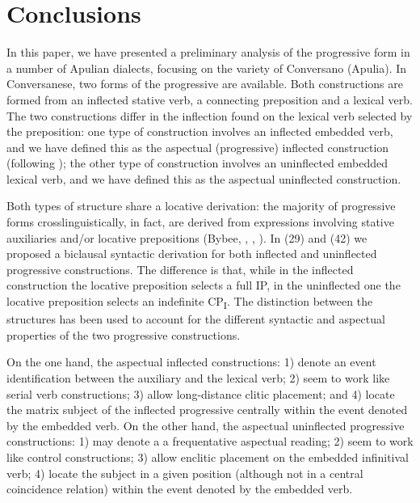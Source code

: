 \documentclass[output=paper]{langsci/langscibook}
\begin{document}
\section{Conclusions}%
In this paper, we have presented a preliminary analysis of the progressive form in a number of Apulian dialects, focusing on the variety of Conversano (Apulia). In Conversanese, two forms of the progressive are available. Both constructions are formed from an inflected stative verb, a connecting preposition and a lexical verb. The two constructions differ in the inflection found on the lexical verb selected by the preposition: one type of construction involves an inflected embedded verb, and we have defined this as the aspectual (progressive) inflected construction (following \citealt{Manzini2005}); the other type of construction involves an uninflected embedded lexical verb, and we have defined this as the aspectual uninflected construction. 

Both types of structure share a locative derivation: the majority of progressive forms crosslinguistically, in fact, are derived from expressions involving stative auxiliaries and/or locative prepositions (Bybee, \citealt{Perkins1994}, \citealt{Mateu1999}, \citealt{Laka2006}). In (29) and (42) we proposed a biclausal syntactic derivation for both inflected and uninflected progressive constructions. The difference is that, while in the inflected construction the locative preposition selects a full IP, in the uninflected one the locative preposition selects an indefinite CP\textsubscript{I}. The distinction between the structures has been used to account for the different syntactic and aspectual properties of the two progressive constructions. 

On the one hand, the aspectual inflected constructions: 1) denote an event identification between the auxiliary and the lexical verb; 2) seem to work like serial verb constructions; 3) allow long-distance clitic placement; and 4) locate the matrix subject of the inflected progressive centrally within the event denoted by the embedded verb. On the other hand, the aspectual uninflected progressive constructions: 1) may denote a a frequentative aspectual reading; 2) seem to work like control constructions; 3) allow enclitic placement on the embedded infinitival verb; 4) locate the subject in a given position (although not in a central coincidence relation) within the event denoted by the embedded verb. 
\end{document}
